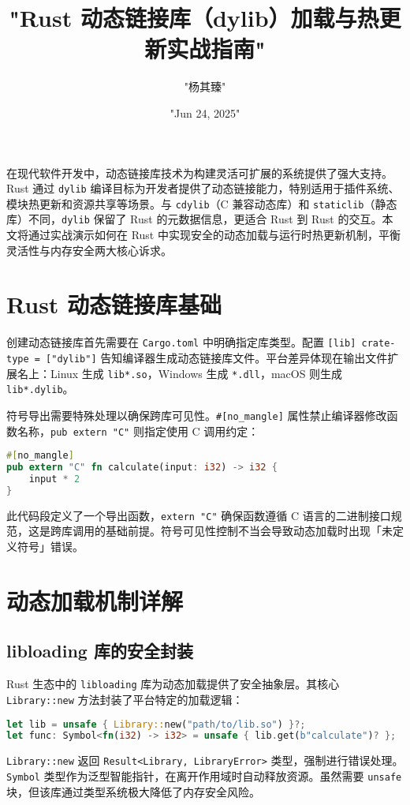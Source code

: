 \title{"Rust 动态链接库（dylib）加载与热更新实战指南"}
\author{"杨其臻"}
\date{"Jun 24, 2025"}
\maketitle
在现代软件开发中，动态链接库技术为构建灵活可扩展的系统提供了强大支持。Rust 通过 \texttt{dylib} 编译目标为开发者提供了动态链接能力，特别适用于插件系统、模块热更新和资源共享等场景。与 \texttt{cdylib}（C 兼容动态库）和 \texttt{staticlib}（静态库）不同，\texttt{dylib} 保留了 Rust 的元数据信息，更适合 Rust 到 Rust 的交互。本文将通过实战演示如何在 Rust 中实现安全的动态加载与运行时热更新机制，平衡灵活性与内存安全两大核心诉求。\par
\chapter{Rust 动态链接库基础}
创建动态链接库首先需要在 \texttt{Cargo.toml} 中明确指定库类型。配置 \texttt{[lib] crate-type = ["dylib"]} 告知编译器生成动态链接库文件。平台差异体现在输出文件扩展名上：Linux 生成 \texttt{lib*.so}，Windows 生成 \texttt{*.dll}，macOS 则生成 \texttt{lib*.dylib}。\par
符号导出需要特殊处理以确保跨库可见性。\texttt{\#{}[no\_{}mangle]} 属性禁止编译器修改函数名称，\texttt{pub extern "C"} 则指定使用 C 调用约定：\par
\begin{lstlisting}[language=rust]
#[no_mangle]
pub extern "C" fn calculate(input: i32) -> i32 { 
    input * 2 
}
\end{lstlisting}
此代码段定义了一个导出函数，\texttt{extern "C"} 确保函数遵循 C 语言的二进制接口规范，这是跨库调用的基础前提。符号可见性控制不当会导致动态加载时出现「未定义符号」错误。\par
\chapter{动态加载机制详解}
\section{libloading 库的安全封装}
Rust 生态中的 \texttt{libloading} 库为动态加载提供了安全抽象层。其核心 \texttt{Library::new} 方法封装了平台特定的加载逻辑：\par
\begin{lstlisting}[language=rust]
let lib = unsafe { Library::new("path/to/lib.so") }?;
let func: Symbol<fn(i32) -> i32> = unsafe { lib.get(b"calculate")? };
\end{lstlisting}
\texttt{Library::new} 返回 \texttt{Result<Library, LibraryError>} 类型，强制进行错误处理。\texttt{Symbol} 类型作为泛型智能指针，在离开作用域时自动释放资源。虽然需要 \texttt{unsafe} 块，但该库通过类型系统极大降低了内存安全风险。\par
